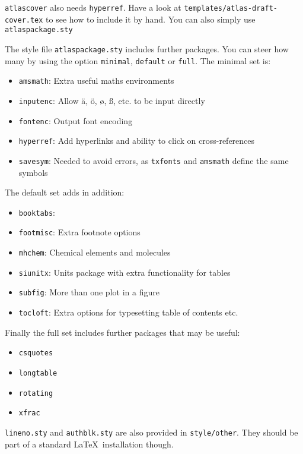 \documentclass[koma,UKenglish]{style/atlasdoc}
\newcommand{\Package}[1]{\texttt{#1}\xspace}
\begin{document}
\texttt{atlascover} also needs \texttt{hyperref}. 
Have a look at \texttt{templates/atlas-draft-cover.tex} to see how to include it by hand.
You can also simply use \texttt{atlaspackage.sty}

The style file \texttt{atlaspackage.sty} includes further packages.
You can steer how many by using the option \texttt{minimal}, \texttt{default} or \texttt{full}.
The minimal set is:
\begin{itemize}\setlength{\parskip}{0pt}\setlength{\itemsep}{0pt}
\item \texttt{amsmath}: Extra useful maths environments
\item \texttt{inputenc}: Allow ä, ö, ø, ß, etc. to be input directly
\item \texttt{fontenc}: Output font encoding
\item \texttt{hyperref}: Add hyperlinks and ability to click on cross-references
\item \Package{savesym}: Needed to avoid errors, as \Package{txfonts}and \Package{amsmath} define the same symbols
\end{itemize}

The default set adds in addition:
\begin{itemize}\setlength{\parskip}{0pt}\setlength{\itemsep}{0pt}
\item \texttt{booktabs}:
\item \texttt{footmisc}: Extra footnote options
\item \texttt{mhchem}: Chemical elements and molecules
\item \texttt{siunitx}: Units package with extra functionality for tables
\item \texttt{subfig}: More than one plot in a figure
\item \texttt{tocloft}: Extra options for typesetting table of contents etc.
\end{itemize}

Finally the full set includes further packages that may be useful:
\begin{itemize}\setlength{\parskip}{0pt}\setlength{\itemsep}{0pt}
\item \texttt{csquotes}
\item \texttt{longtable}
\item \texttt{rotating}
\item \texttt{xfrac}
\end{itemize}

\texttt{lineno.sty} and \texttt{authblk.sty} are also provided in \texttt{style/other}.
They should be part of a standard \LaTeX\ installation though.
\end{document}
